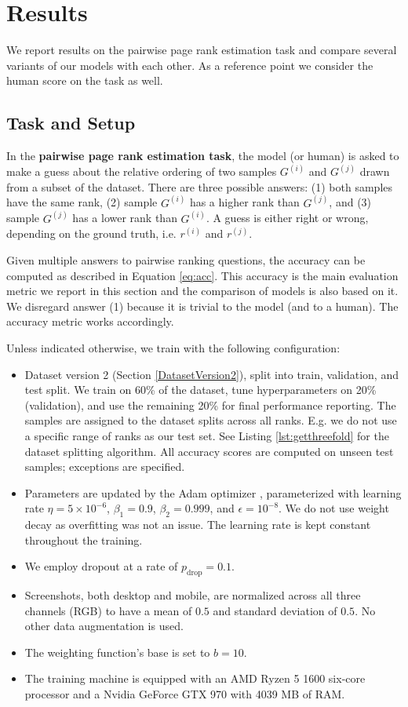 \section{Results}

We report results on the pairwise page rank estimation task and compare several variants of our models with each other. As a reference point we consider the human score on the task as well.

\subsection{Task and Setup}

In the \textbf{pairwise page rank estimation task}, the model (or human) is asked to make a guess about the relative ordering of two samples $G^{(i)}$ and $G^{(j)}$ drawn from a subset of the dataset.
There are three possible answers: (1) both samples have the same rank, (2) sample $G^{(i)}$ has a higher rank than $G^{(j)}$, and (3) sample $G^{(j)}$ has a lower rank than $G^{(i)}$. A guess is either right or wrong, depending on the ground truth, i.e. $r^{(i)}$ and $r^{(j)}$.

Given multiple answers to pairwise ranking questions, the accuracy can be computed as described in Equation \ref{eq:acc}. This accuracy is the main evaluation metric we report in this section and the comparison of models is also based on it. We disregard answer (1) because it is trivial to the model (and to a human). The accuracy metric works accordingly.

Unless indicated otherwise, we train with the following configuration:
\begin{itemize}
    \item Dataset version 2 (Section \ref{DatasetVersion2}), split into train, validation, and test split. We train on 60\% of the dataset, tune hyperparameters on 20\% (validation), and use the remaining 20\% for final performance reporting. The samples are assigned to the dataset splits across all ranks. E.g. we do not use a specific range of ranks as our test set. See Listing \ref{lst:getthreefold} for the dataset splitting algorithm. All accuracy scores are computed on unseen test samples; exceptions are specified.
    \item Parameters are updated by the Adam optimizer \cite{kingma2014:adam}, parameterized with learning rate $\eta=5\times10^{-6}$, $\beta_1=0.9$, $\beta_2=0.999$, and $\epsilon=10^{-8}$. We do not use weight decay as overfitting was not an issue. The learning rate is kept constant throughout the training.
    \item We employ dropout \cite{srivastava2014:dropout} at a rate of $p_\text{drop}=0.1$.
    \item Screenshots, both desktop and mobile, are normalized across all three channels (RGB) to have a mean of $0.5$ and standard deviation of $0.5$. No other data augmentation is used.
    \item The weighting function's base is set to $b=10$.
    \item The training machine is equipped with an AMD Ryzen 5 1600 six-core processor and a Nvidia GeForce GTX 970 with 4039 MB of RAM.
\end{itemize}

